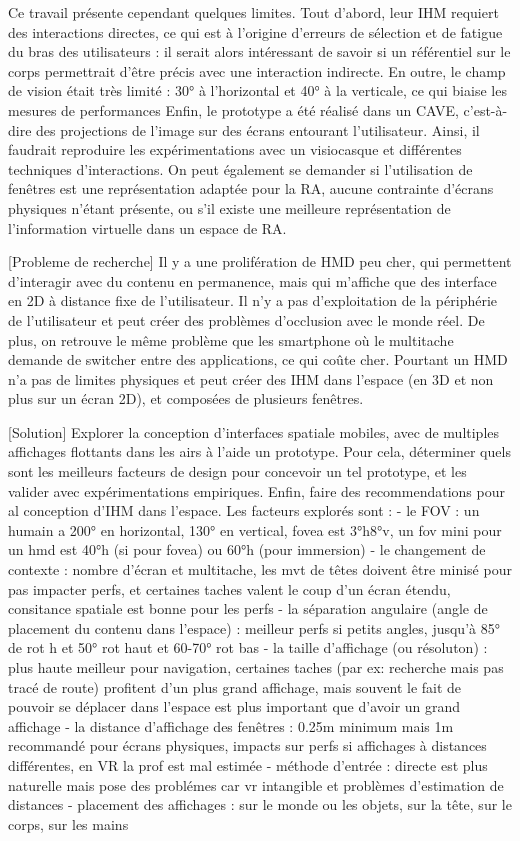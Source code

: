 Ce travail présente cependant quelques limites. Tout d'abord, leur IHM requiert des interactions directes, ce qui est à l'origine d'erreurs de sélection et de fatigue du bras des utilisateurs : il serait alors intéressant de savoir si un référentiel sur le corps permettrait d'être précis avec une interaction indirecte. En outre, le champ de vision était très limité : 30° à l'horizontal et 40° à la verticale, ce qui biaise les mesures de performances Enfin, le prototype a été réalisé dans un CAVE, c'est-à-dire des projections de l'image sur des écrans entourant l'utilisateur. Ainsi, il faudrait reproduire les expérimentations avec un visiocasque et différentes techniques d'interactions. On peut également se demander si l'utilisation de fenêtres est une représentation adaptée pour la RA, aucune contrainte d'écrans physiques n'étant présente, ou s'il existe une meilleure représentation de l'information virtuelle dans un espace de RA.

[Probleme de recherche]
Il y a une prolifération de HMD peu cher, qui permettent d'interagir avec du contenu en permanence, mais qui m'affiche que des interface en 2D à distance fixe de l'utilisateur. Il n'y a pas d'exploitation de la
 périphérie de l'utilisateur et peut créer des problèmes d'occlusion avec le monde réel. De plus, on retrouve le même problème que les smartphone où le multitache demande de switcher entre des applications, ce
qui coûte cher. Pourtant un HMD n'a pas de limites physiques et peut créer des IHM dans l'espace (en 3D et non plus sur un écran 2D), et composées de plusieurs fenêtres.

[Solution]
Explorer la conception d'interfaces spatiale mobiles, avec de multiples affichages flottants dans les airs à l'aide un prototype. Pour cela, déterminer quels sont les meilleurs facteurs de design pour concevoir
 un tel prototype, et les valider avec expérimentations empiriques. Enfin, faire des recommendations pour al conception d'IHM dans l'espace.
Les facteurs explorés sont :
- le FOV : un humain a 200° en horizontal, 130° en vertical, fovea est 3°h8°v, un fov mini pour un hmd est 40°h (si pour fovea) ou 60°h (pour immersion)
- le changement de contexte : nombre d'écran et multitache, les mvt de têtes doivent être minisé pour pas impacter perfs, et certaines taches valent le coup d'un écran étendu, consitance spatiale est bonne pour
 les perfs
- la séparation angulaire (angle de placement du contenu dans l'espace) : meilleur perfs si petits angles, jusqu'à 85° de rot h et 50° rot haut et 60-70° rot bas
- la taille d'affichage (ou résoluton) : plus haute meilleur pour navigation, certaines taches (par ex: recherche mais pas tracé de route) profitent d'un plus grand affichage, mais souvent le fait de pouvoir se déplacer dans l'espace est plus important que d'avoir un grand affichage
- la distance d'affichage des fenêtres : 0.25m minimum mais 1m recommandé pour écrans physiques, impacts sur perfs si affichages à distances différentes, en VR la prof est mal estimée
- méthode d'entrée : directe est plus naturelle mais pose des problémes car vr intangible et problèmes d'estimation de distances
- placement des affichages : sur le monde ou les objets, sur la tête, sur le corps, sur les mains

